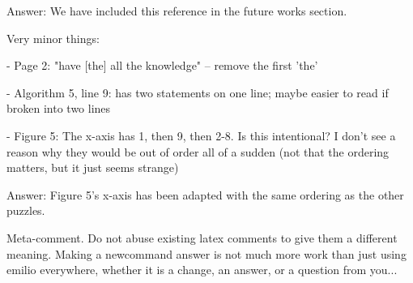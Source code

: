 \documentclass{article}
\newcommand\comment[1]{\marginpar{\tiny #1}}
\renewcommand\comment[1]{#1}
\newcommand{\emilio}[1]{{\comment{Answer: \color{red}#1}}}
\newcommand{\bart}[1]{{\comment{\color{green}#1}}}
\begin{document}
\emilio{We have included this reference in the future works section.}

Very minor things:

- Page 2: "have [the] all the knowledge" -- remove the first 'the'

- Algorithm 5, line 9: has two statements on one line; maybe easier to
read if broken into two lines

- Figure 5: The x-axis has 1, then 9, then 2-8. Is this intentional? I
don't see a reason why they would be out of order all of a sudden (not
that the ordering matters, but it just seems strange)

\emilio{Figure 5's x-axis has been adapted with the same ordering as the other puzzles.}

\bart{Meta-comment. Do not abuse existing latex comments to give them a different meaning. Making a newcommand answer is not much more work than just using emilio everywhere, whether it is a change, an answer, or a question from you... }
\end{document}
